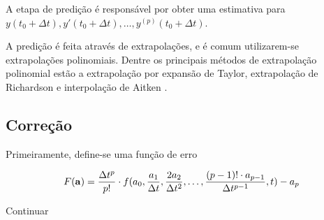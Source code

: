 A etapa de predição é responsável por obter uma estimativa para \(y(t_0 + \Delta t), y'(t_0 + \Delta t),\dots, y^{(p)}(t_0 + \Delta t)\).

A predição é feita através de extrapolações, e é comum utilizarem-se extrapolações polinomiais. Dentre os principais métodos de extrapolação polinomial estão a extrapolação por expansão de Taylor, extrapolação de Richardson e interpolação de Aitken .

\subsection{Correção}

Primeiramente, define-se uma função de erro

\begin{equation*}
  F\pqty{\vec{a}} = \dfrac{\Delta t^p}{p!}\cdot f(a_0, \dfrac{a_1}{\Dt}, \dfrac{2a_2}{\Dt^2},\dots,\dfrac{\pqty{p-1}!\cdot a_{p-1}}{\Dt^{p-1}}, t) - a_p
\end{equation*}

\alert{Continuar}
 